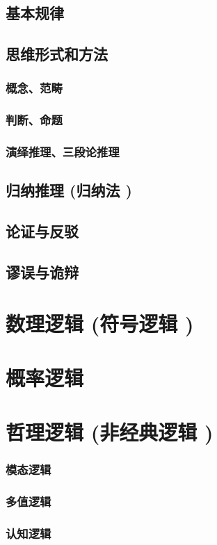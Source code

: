 \documentclass[UTF8]{../RepresentationUniverse}
\begin{document}
    \subsection{基本规律}
    \subsection{思维形式和方法}
        \subsubsection{概念、范畴}
        \subsubsection{判断、命题}
        \subsubsection{演绎推理、三段论推理}
    \subsection{归纳推理 (归纳法 )}
    \subsection{论证与反驳}
    \subsection{谬误与诡辩}
\section{数理逻辑 (符号逻辑 )}
\section{概率逻辑}
\section{哲理逻辑 (非经典逻辑 )}
    \subsubsection{模态逻辑}
    \subsubsection{多值逻辑}
    \subsubsection{认知逻辑}
\end{document}
